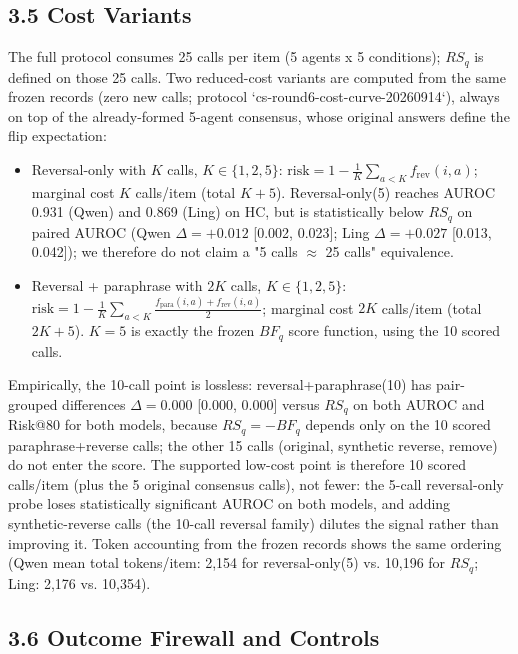 \documentclass[11pt]{article}
\begin{document}
\subsection{3.5 Cost Variants}

The full protocol consumes 25 calls per item (5 agents x 5 conditions); $RS_q$ is defined on those 25 calls. Two reduced-cost variants are computed from the same frozen records (zero new calls; protocol `cs-round6-cost-curve-20260914`), always on top of the already-formed 5-agent consensus, whose original answers define the flip expectation:

\begin{itemize}
  \item Reversal-only with $K$ calls, $K \in \{1,2,5\}$: $\mathrm{risk} = 1 - \frac{1}{K}\sum_{a < K} f_{\mathrm{rev}}(i,a)$; marginal cost $K$ calls/item (total $K+5$). Reversal-only(5) reaches AUROC 0.931 (Qwen) and 0.869 (Ling) on HC, but is statistically below $RS_q$ on paired AUROC (Qwen $\Delta = +0.012$ [0.002, 0.023]; Ling $\Delta = +0.027$ [0.013, 0.042]); we therefore do not claim a "5 calls $\approx$ 25 calls" equivalence.
  \item Reversal + paraphrase with $2K$ calls, $K \in \{1,2,5\}$: $\mathrm{risk} = 1 - \frac{1}{K}\sum_{a < K}\frac{f_{\mathrm{para}}(i,a) + f_{\mathrm{rev}}(i,a)}{2}$; marginal cost $2K$ calls/item (total $2K+5$). $K = 5$ is exactly the frozen $BF_q$ score function, using the 10 scored calls.
\end{itemize}

Empirically, the 10-call point is lossless: reversal+paraphrase(10) has pair-grouped differences $\Delta = 0.000$ [0.000, 0.000] versus $RS_q$ on both AUROC and Risk@80 for both models, because $RS_q = -BF_q$ depends only on the 10 scored paraphrase+reverse calls; the other 15 calls (original, synthetic reverse, remove) do not enter the score. The supported low-cost point is therefore 10 scored calls/item (plus the 5 original consensus calls), not fewer: the 5-call reversal-only probe loses statistically significant AUROC on both models, and adding synthetic-reverse calls (the 10-call reversal family) dilutes the signal rather than improving it. Token accounting from the frozen records shows the same ordering (Qwen mean total tokens/item: 2,154 for reversal-only(5) vs. 10,196 for $RS_q$; Ling: 2,176 vs. 10,354).

\subsection{3.6 Outcome Firewall and Controls}
\end{document}
